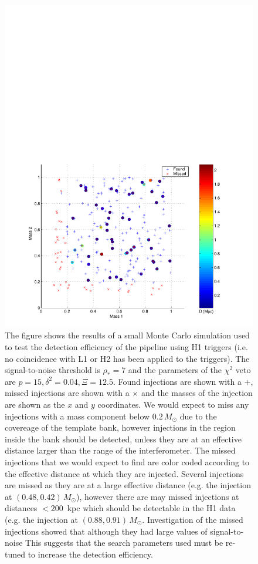 \begin{figure}[p]
\begin{center}
\includegraphics[width=\textwidth]{figures/result/h1_inj_mass_7_0_delta_0_04_chisq_12_5}
\end{center}
\caption[Found and Missed H1 Injections for $\Xi = 12.5 \delta^2 = 0.04$]{%
\label{f:h1_missed_tuning}%
The figure shows the results of a small Monte Carlo simulation used to test
the detection efficiency of the pipeline using H1 triggers (i.e. no
coincidence with L1 or H2 has been applied to the triggers). The
signal-to-noise threshold is $\rho_\ast = 7$ and the parameters of the
$\chi^2$ veto are $p = 15, \delta^2 = 0.04, \Xi = 12.5$. Found injections are
shown with a $+$, missed injections are shown with a $\times$ and the masses
of the injection are shown as the $x$ and $y$ coordinates. We would expect to
miss any injections with a mass component below $0.2\,M_\odot$ due to the
covereage of the template bank, however injections in the region inside the
bank should be detected, unless they are at an effective distance larger than
the range of the interferometer. The missed injections that we would expect to
find are color coded according to the effective distance at which they are
injected.  Several injections are missed as they are at a large effective
distance (e.g.  the injection at $(0.48,0.42)\,M_\odot$), however there are
may missed injections at distances $< 200$~kpc which should be detectable in
the H1 data (e.g. the injection at $(0.88,0.91)\,M_\odot$. Investigation of
the missed injections showed that although they had large values of
signal-to-noise This suggests that
the search parameters used must be re-tuned to increase the detection
efficiency.
}
\end{figure}

